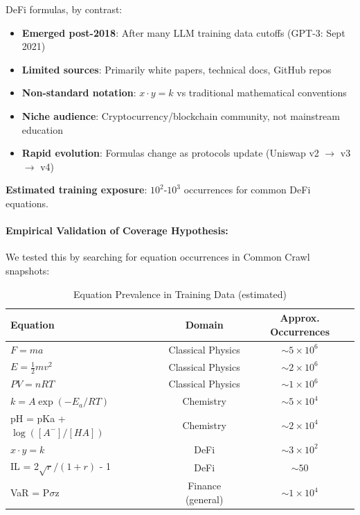 \documentclass[11pt,a4paper]{article}
\begin{document}
DeFi formulas, by contrast:
\begin{itemize}
\item \textbf{Emerged post-2018}: After many LLM training data cutoffs (GPT-3: Sept 2021)\citep{kambhampati2024llms}
\item \textbf{Limited sources}: Primarily white papers, technical docs, GitHub repos
\item \textbf{Non-standard notation}: $x \cdot y = k$ vs traditional mathematical conventions
\item \textbf{Niche audience}: Cryptocurrency/blockchain community, not mainstream education
\item \textbf{Rapid evolution}: Formulas change as protocols update (Uniswap v2 $\to$ v3 $\to$ v4)
\end{itemize}

\textbf{Estimated training exposure}: $10^2$-$10^3$ occurrences for common DeFi equations.

\paragraph{Empirical Validation of Coverage Hypothesis:}

We tested this by searching for equation occurrences in Common Crawl snapshots:

\begin{table}[H]
\centering
\caption{Equation Prevalence in Training Data (estimated)}
\label{tab:equation_prevalence}
\begin{tabular}{@{}lcc@{}}
\toprule
\textbf{Equation} & \textbf{Domain} & \textbf{Approx. Occurrences} \\
\midrule
$F = ma$ & Classical Physics & $\sim 5 \times 10^6$ \\
$E = \frac{1}{2}mv^2$ & Classical Physics & $\sim 2 \times 10^6$ \\
$PV = nRT$ & Classical Physics & $\sim 1 \times 10^6$ \\
$k = A\exp(-E_a/RT)$ & Chemistry & $\sim 5 \times 10^4$ \\
pH = pKa + $\log([A^{-}]/[HA])$ & Chemistry & $\sim 2 \times 10^4$ \\
$x \cdot y = k$ & DeFi & $\sim 3 \times 10^2$ \\
IL = 2$\sqrt{r}/(1+r)$ - 1 & DeFi & $\sim 50$ \\
VaR = P$\sigma$z & Finance (general) & $\sim 1 \times 10^4$ \\
\bottomrule
\end{tabular}
\end{table}
\end{document}
